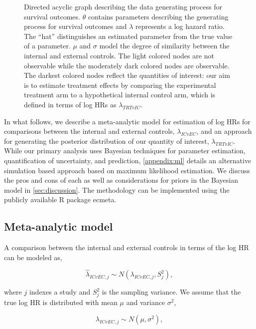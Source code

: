 \documentclass[11pt,final,fleqn]{article}\usepackage[]{graphicx}\usepackage[]{color}
\newcommand{\pkg}[1]{{\fontseries{m}\fontseries{b}\selectfont #1}}
\begin{document}
\begin{figure}[t!]
\begin{subfigure}[b]{\textwidth}
\end{subfigure}
\caption{Directed acyclic graph describing the data generating process for survival outcomes. $\theta$ contains parameters describing the generating process for survival outcomes and $\lambda$ represents a log hazard ratio. The ``hat'' distinguishes an estimated parameter from the true value of a parameter. $\mu$ and $\sigma$ model the degree of similarity between the internal and external controls. The light colored nodes are not observable while the moderately dark colored nodes are observable. The darkest colored nodes reflect the quantities of interest: our aim is to estimate treatment effects by comparing the experimental treatment arm to a hypothetical internal control arm, which is defined in terms of log HRs as $\lambda_{TRTvIC}$.}
\label{fig:dag}
\end{figure}

In what follows, we describe a meta-analytic model for estimation of log HRs for comparisons between the internal and external controls, $\lambda_{ICvEC}$, and an approach for generating the posterior distribution of our quantity of interest, $\lambda_{TRTvIC}$. While our primary analysis uses Bayesian techniques for parameter estimation, quantification of uncertainty, and prediction, \autoref{appendix:ml} details an alternative simulation based approach based on maximum likelihood estimation. We discuss the pros and cons of each as well as considerations for priors in the Bayesian model in \autoref{sec:discussion}. The methodology can be implemented using the publicly available \textsf{R} package \pkg{ecmeta}.

\subsection{Meta-analytic model} \label{subsec:meta-analytic}
A comparison between the internal and external controls in terms of the log HR can be modeled as,

\begin{equation}
\hat\lambda_{ICvEC,j} \sim N (\lambda_{ICvEC,j}, S_j^2),
\end{equation}

where $j$ indexes a study and $S_j^2$ is the sampling variance. We assume that the true log HR is distributed with mean $\mu$ and variance $\sigma^2$, 

\begin{equation}
\lambda_{ICvEC,j} \sim N ( \mu , \sigma^2),
\end{equation}
\end{document}
